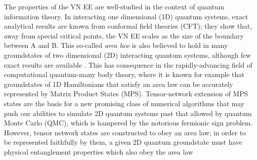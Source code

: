 \documentclass[prl,aps,twocolumn,floatfix,amsmath,amssymb,superscriptaddress,tightenlines]{revtex4}
\begin{document}
The properties of the VN EE are well-studied in the context of quantum information theory.
In interacting one dimensional (1D) quantum systems, exact analytical results are known from conformal
field theories (CFT); they show that, away from special critical points,
the VN EE scales as the size of the boundary between A and B.
This so-called {\it area law} is also believed to hold in many
groundstates of two dimensional (2D) interacting quantum systems,
although few exact results are available \cite{ALreview}.  This has 
consequence in the
rapidly-advancing field of computational quantum-many body theory, where
it is known for example that groundstates of 1D Hamiltonians that satisfy an area law
can be accurately represented by Matrix Product States (MPS).
Tensor-network extension of MPS states are the basis
for a new promising class of numerical algorithms that may push our
abilities to simulate 2D quantum systems past that
allowed by quantum Monte Carlo (QMC), which is hampered by
the notorious fermionic sign problem.  However, tensor network states
are constructed to obey an area law; in order to be represented faithfully
by them, a given 2D quantum groundstate must have physical entanglement
properties which also obey the area law \cite{ALreview}


\end{document}
